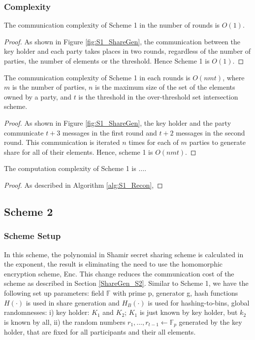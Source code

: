 \subsubsection{Complexity}
\begin{theorem}
The communication complexity of Scheme 1 in the number of rounds is $O(1)$. 
\end{theorem}
\begin{proof}
As shown in Figure \ref{fig:S1_ShareGen}, the communication between the key holder and each party takes places in two rounds, regardless of the number of parties, the number of elements or the threshold. Hence Scheme 1 is $O(1)$. 
\end{proof}
\begin{theorem}
The communication complexity of Scheme 1 in each rounds is $O(nmt)$, where $m$ is the number of parties, $n$ is the maximum size of the set of the elements owned by a party, and $t$ is the threshold in the over-threshold set intersection scheme.  
\end{theorem}
\begin{proof}
As shown in Figure \ref{fig:S1_ShareGen}, the key holder and the party communicate $t+3$ messages in the first round and $t+2$ messages in the second round. This communication is iterated $n$ times for each of $m$ parties to generate share for all of their elements. Hence, scheme 1 is $O(nmt)$.  
\end{proof}
\begin{theorem}
The computation complexity of Scheme 1 is $\dots$. 
\end{theorem}
\begin{proof}
As described in Algorithm \ref{alg:S1_Recon},
\end{proof}

\subsection{Scheme 2}
\subsubsection{Scheme Setup}
In this scheme, the polynomial in Shamir secret sharing scheme is calculated in the exponent, the result is eliminating the need to use the homomorphic encryption scheme, Enc. This change reduces the communication cost of the scheme as described in Section \ref{ShareGen_S2}. Similar to Scheme 1, we have the following set up parameters: field $\mathbb{F}$ with prime p, generator g, hash functions $H(\cdot)$ is used in share generation and $H_B(\cdot)$ is used for hashing-to-bins, global randomnesses: i) key holder: $K_1$ and $K_2$; $K_1$ is just known by key holder, but $k_2$ is known by all, ii) the random numbers $r_1, \dots, r_{t-1} \gets \mathbb{F}_p$ generated by the key holder, that are fixed for all participants and their all elements. 

